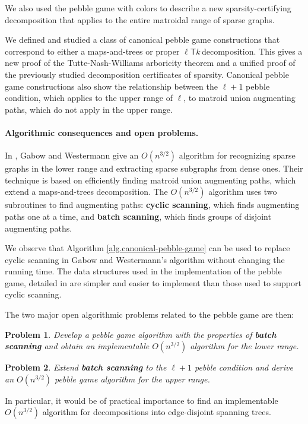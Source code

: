 \documentclass[Svgc,nospthms]{Svgc}
\newcommand{\ellteekay}{\ensuremath{\ell{\mathsf T}k}\,}
\newtheorem{problem}{Problem}
\newcommand{\refalg}[1]{Algorithm \ref{alg.#1}}
\begin{document}
	We also used the pebble game with colors to describe a new sparsity-certifying 
	decomposition that applies to the entire matroidal range of sparse graphs.

	We defined and studied a class of canonical pebble game constructions that correspond to either a
	 maps-and-trees or proper \ellteekay decomposition. This gives a new proof of the Tutte-Nash-Williams 
	arboricity theorem and a unified proof of the previously studied decomposition certificates of sparsity.
	Canonical pebble game constructions also show the relationship
	between the $\ell+1$ pebble condition, which applies to the upper range of 
	$\ell$, to matroid union augmenting paths, which do not apply in the upper range.

	
	\paragraph{Algorithmic consequences and open problems.}
	In \cite{gabow:forests:1992}, Gabow and Westermann give an $O(n^{3/2})$ algorithm for recognizing sparse
	graphs in the lower range and extracting sparse subgraphs from dense ones.  Their technique 
	is based on efficiently finding matroid union augmenting paths, which extend  a maps-and-trees
	decomposition.  The $O(n^{3/2})$ algorithm uses two subroutines to find augmenting paths: {\bf 
	cyclic scanning}, which finds augmenting paths one at a time, and {\bf batch scanning}, which 
	finds groups of disjoint augmenting paths.
	
	We observe that \refalg{canonical-pebble-game} can be used to replace cyclic scanning in 
	Gabow and Westermann's algorithm without changing the running time.  The data structures 
	used in the implementation of the pebble game, detailed in \cite{cccg,pebblegame} are 
	simpler and easier to implement than those used to support cyclic scanning.
	
	The two major open algorithmic problems related to the pebble game are then:
	
	\begin{problem}
		Develop a pebble game algorithm with the properties of {\bf batch scanning} and
		obtain an implementable $O(n^{3/2})$ algorithm for the lower range.
	\end{problem}
	
	\begin{problem}
		Extend {\bf batch scanning} to the $\ell+1$ pebble condition and derive an $O(n^{3/2})$
		pebble game algorithm for the upper range.
	\end{problem}
	In particular, it would be of practical importance 
	to find an implementable $O(n^{3/2})$ algorithm for decompositions 
	into edge-disjoint spanning trees.
\end{document}
